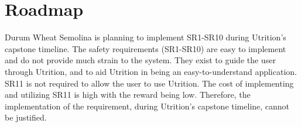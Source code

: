\documentclass{article}
\begin{document}
\section{Roadmap}


Durum Wheat Semolina is planning to implement SR1-SR10 during Utrition's capstone timeline. The safety requirements (SR1-SR10) are easy to implement and do not provide much strain to the system. They exist to guide the user through Utrition, and to aid Utrition in being an easy-to-understand application. SR11 is not required to allow the user to use Utrition. The cost of implementing and utilizing SR11 is high with the reward being low. Therefore, the implementation of the requirement, during Utrition's capstone timeline, cannot be justified.
	
\end{document}
